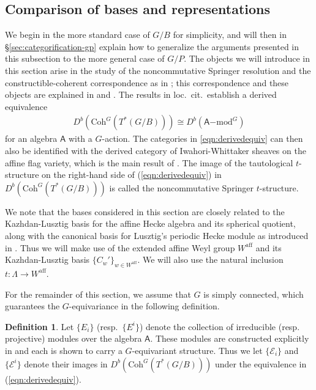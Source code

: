 \documentclass{amsart}
\theoremstyle{definition}
\newtheorem{defn}[thm]{Definition}
\begin{document}
\subsection{Comparison of bases and representations}


We begin in the more standard case of $G/B$ for simplicity, and will then in \S \ref{sec:categorification-gp} explain how to generalize the arguments presented in this subsection to the more general case of $G/P$. The objects we will introduce in this section arise in the study of the noncommutative Springer resolution and the constructible-coherent correspondence as in \cite{AB}; this correspondence and these objects are explained in \cite{BezTilt} and \cite{BM}. The results in loc.\ cit.\ establish a derived equivalence
\begin{align}
    D^b(\mathrm{Coh}^G(T^*(G/B))) \cong D^b(\mathsf{A}\mathrm{-mod}^G)\label{eqn:derivedequiv}
\end{align}
for an algebra $\mathsf{A}$ with a $G$-action. The categories in \eqref{eqn:derivedequiv} can then also be identified with the derived category of Iwahori-Whittaker sheaves on the affine flag variety, which is the main result of \cite{AB}. The image of the tautological $t$-structure on the right-hand side of (\ref{eqn:derivedequiv}) in $D^b(\mathrm{Coh}^G(T^*(G/B)))$ is called the noncommutative Springer $t$-structure.

We note that the bases considered in this section are closely related to the Kazhdan-Lusztig basis for the affine Hecke algebra and its spherical quotient, along with the canonical basis for Lusztig's periodic Hecke module as introduced in \cite{LPeriodic1, LPeriodic2}. Thus we will make use of the extended affine Weyl group $W^{\mathrm{aff}}$ and its Kazhdan-Lusztig basis $\{C_w'\}_{w \in W^{\mathrm{aff}}}$. We will also use the natural inclusion $t : \Lambda \to W^{\mathrm{aff}}$.

For the remainder of this section, we assume that $G$ is simply connected, which guarantees the $G$-equivariance in the following definition.
\begin{defn}
    Let $\{E_i\}$ (resp.\ $\{E^i\}$) denote the collection of irreducible (resp. projective) modules over the algebra $\mathsf A$. These modules are constructed explicitly in \cite{BM} and each is shown to carry a $G$-equivariant structure. Thus we let $\{\mathcal{E}_i\}$ and $\{\mathcal{E}^i\}$ denote their images in $D^b(\mathrm{Coh}^G(T^*(G/B)))$ under the equivalence in (\ref{eqn:derivedequiv}).
\end{defn}
\end{document}
